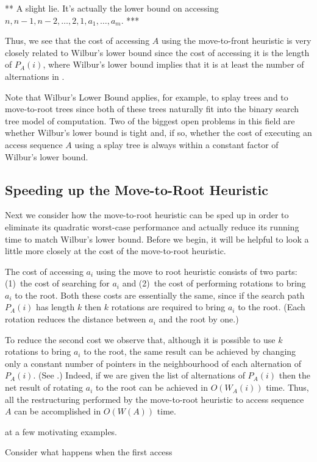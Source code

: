 \documentclass[charterfonts,lotsofwhite]{patmorin}
\newcommand{\visiblecomment}[1]{\noindent*** #1 ***}
\begin{document}
\visiblecomment{A slight lie.  It's actually the lower bound on
accessing $n,n-1,n-2,\ldots,2,1,a_1,\ldots,a_m$.}

Thus, we see that the cost of accessing $A$ using the move-to-front
heuristic is very closely related to Wilbur's lower bound since the
cost of accessing it
is the length of $P_A(i)$, where Wilbur's lower bound implies that it
is at least the number of alternations in .

Note that Wilbur's Lower Bound applies, for example, to splay trees
and to move-to-root trees since both of these trees naturally fit into
the binary search tree model of computation.  Two of the biggest open
problems in this field are whether Wilbur's lower bound is tight and,
if so, whether the cost of executing an access sequence $A$ using a
splay tree is always within a constant factor of Wilbur's lower bound.

\subsection{Speeding up the Move-to-Root Heuristic}

Next we consider how the move-to-root heuristic can be sped up in
order to eliminate its quadratic worst-case performance and actually
reduce its running time to match Wilbur's lower bound.  Before we
begin, it will be helpful to look a little more closely at the cost of
the move-to-root heuristic.

The cost of accessing $a_i$ using the move to root heuristic consists
of two parts: (1)~the cost of searching for $a_i$ and (2)~the cost of
performing rotations to bring $a_i$ to the root.  Both these costs are
essentially the same, since if the search path $P_A(i)$ has length $k$
then $k$ rotations are required to bring $a_i$ to the root. (Each
rotation reduces the distance between $a_i$ and the root by one.)

To reduce the second cost we observe that, although it is possible to
use $k$ rotations to bring $a_i$ to the root, the same result can be
achieved by changing only a constant number of pointers in the
neighbourhood of each alternation of $P_A(i)$. (See
.)  Indeed, if we are given the list of
alternations of $P_A(i)$ then the net result of rotating $a_i$ to the
root can be achieved in $O(W_A(i))$ time.  Thus, all the restructuring
performed by the move-to-root heuristic to access sequence $A$ can be
accomplished in $O(W(A))$ time.



at a few motivating examples.

Consider what happens when the first access
\end{document}
